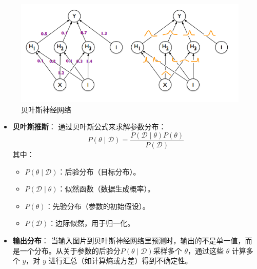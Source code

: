\begin{figure}[H]
    \centering
    \includegraphics[width=0.75\linewidth]{assets/2-1.png}
    \caption{贝叶斯神经网络\cite{blundell2015weight}
}
    \label{fig:enter-label}
\end{figure}


\begin{itemize}
    \item \textbf{贝叶斯推断}：
    通过贝叶斯公式来求解参数分布：
    \[
    P(\theta \mid \mathcal{D}) = \frac{P(\mathcal{D} \mid \theta) P(\theta)}{P(\mathcal{D})}
    \]
    其中：
    \begin{itemize}
        \item \( P(\theta \mid \mathcal{D}) \)：后验分布（目标分布）。
        \item \( P(\mathcal{D} \mid \theta) \)：似然函数（数据生成概率）。
        \item \( P(\theta) \)：先验分布（参数的初始假设）。
        \item \( P(\mathcal{D}) \)：边际似然，用于归一化。
    \end{itemize}
    
    \item \textbf{输出分布}：
    当输入图片到贝叶斯神经网络里预测时，输出的不是单一值，而是一个分布。从关于参数的后验分\( P(\theta \mid \mathcal{D}) \)采样多个 \( \theta \)，通过这些 \( \theta \) 计算多个 \( y \)，对 \( y \) 进行汇总（如计算熵或方差）得到不确定性。
\end{itemize}

